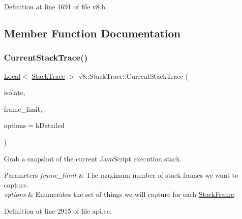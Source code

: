 Definition at line 1691 of file v8.\+h.



\subsection{Member Function Documentation}
\mbox{\label{classv8_1_1StackTrace_a784e1357ed18f93f14d1fc8e9fe078cf}} 
\subsubsection{\texorpdfstring{Current\+Stack\+Trace()}{CurrentStackTrace()}}
{\footnotesize\ttfamily \mbox{\hyperlink{classv8_1_1Local}{Local}}$<$ \mbox{\hyperlink{classv8_1_1StackTrace}{Stack\+Trace}} $>$ v8\+::\+Stack\+Trace\+::\+Current\+Stack\+Trace (\begin{DoxyParamCaption}\item[{Isolate $\ast$}]{isolate,  }\item[{\mbox{\hyperlink{classint}{int}}}]{frame\+\_\+limit,  }\item[{\mbox{\hyperlink{classv8_1_1StackTrace_a9704e4a37949eb8eb8ccddbddf161492}{Stack\+Trace\+Options}}}]{options = {\ttfamily kDetailed} }\end{DoxyParamCaption})\hspace{0.3cm}{\ttfamily [static]}}

Grab a snapshot of the current Java\+Script execution stack.


\begin{DoxyParams}{Parameters}
{\em frame\+\_\+limit} & The maximum number of stack frames we want to capture. \\
\hline
{\em options} & Enumerates the set of things we will capture for each \mbox{\hyperlink{classv8_1_1StackFrame}{Stack\+Frame}}. \\
\hline
\end{DoxyParams}


Definition at line 2915 of file api.\+cc.

\mbox{\label{classv8_1_1StackTrace_a4d42c17268028c668938cbac427779a8}} 
